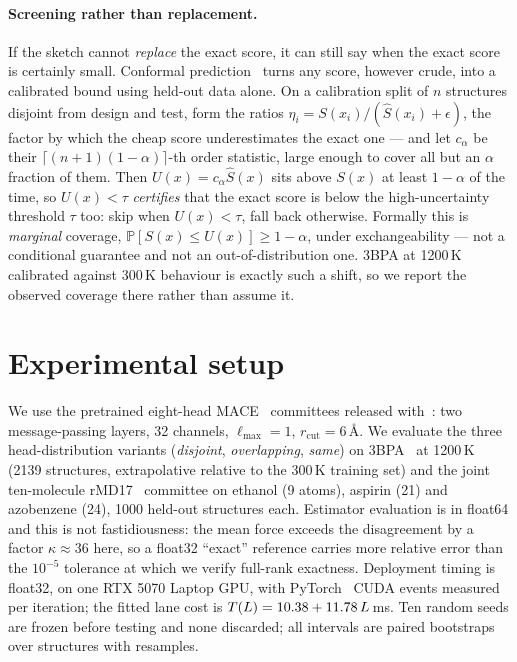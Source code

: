 \documentclass{article}
\begin{document}
\paragraph{Screening rather than replacement.}
If the sketch cannot \emph{replace} the exact score, it can still say when the exact score is
certainly small. Conformal prediction~\citep{vovk2005,crc} turns any score, however crude, into a
calibrated bound using held-out data alone. On a calibration split of $n$ structures disjoint from
design and test, form the ratios $\eta_i=S(x_i)/(\widehat S(x_i)+\epsilon)$, the factor by which
the cheap score underestimates the exact one --- and let $c_\alpha$ be their
$\lceil (n+1)(1-\alpha)\rceil$-th order statistic, large enough to cover all but an $\alpha$
fraction of them. Then $U(x)=c_\alpha\widehat S(x)$ sits above $S(x)$ at least $1-\alpha$ of the
time, so $U(x)<\tau$ \emph{certifies} that the exact score is below the high-uncertainty threshold
$\tau$ too: skip when $U(x)<\tau$, fall back otherwise. Formally this is \emph{marginal} coverage,
$\mathbb P[S(x)\le U(x)]\ge 1-\alpha$, under exchangeability --- not a conditional guarantee and not
an out-of-distribution one. 3BPA at 1200\,K calibrated against 300\,K behaviour is exactly such a
shift, so we report the observed coverage there rather than assume it.

\section{Experimental setup}
\label{sec:setup}
We use the pretrained eight-head MACE~\citep{mace} committees released with~\citet{beck2025mhc}: two message-passing
layers, 32 channels, $\ell_{\max}=1$, $r_{\mathrm{cut}}=6$\,\AA. We evaluate the three
head-distribution variants (\emph{disjoint}, \emph{overlapping}, \emph{same}) on 3BPA~\citep{botnet3bpa} at 1200\,K
(2139 structures, extrapolative relative to the 300\,K training set) and the joint ten-molecule
rMD17~\citep{rmd17} committee on ethanol (9 atoms), aspirin (21) and azobenzene (24), 1000 held-out structures each.
Estimator evaluation is in float64 and this is not fastidiousness: the mean force exceeds the
disagreement by a factor $\kappa\approx36$ here, so a float32 ``exact'' reference carries more
relative error than the $10^{-5}$ tolerance at which we verify full-rank exactness. Deployment
timing is float32, on one RTX 5070 Laptop GPU, with PyTorch~\citep{pytorch} CUDA events measured per
iteration; the fitted lane cost is $T(L)=10.38 + 11.78\,L$\,ms. Ten random seeds
are frozen before testing and none discarded; all intervals are paired
bootstraps~\citep{efron} over structures with \fsNBoot{} resamples.
\end{document}
